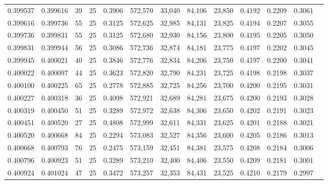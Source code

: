 \begin{tabular}{rrrrrrrrrrrrr}
0.399537 & 0.399616 &    39 &  25 &                                     0.3906 & 572,570 &  33,040 &  84,106 &  23,850 & 0.4192 & 0.2209 & 0.3061 \\
0.399616 & 0.399736 &    55 &  25 &                                     0.3125 & 572,625 &  32,985 &  84,131 &  23,825 & 0.4194 & 0.2207 & 0.3055 \\
0.399736 & 0.399831 &    55 &  25 &                                     0.3125 & 572,680 &  32,930 &  84,156 &  23,800 & 0.4195 & 0.2205 & 0.3050 \\
0.399831 & 0.399944 &    56 &  25 &                                     0.3086 & 572,736 &  32,874 &  84,181 &  23,775 & 0.4197 & 0.2202 & 0.3045 \\
0.399945 & 0.400021 &    40 &  25 &                                     0.3846 & 572,776 &  32,834 &  84,206 &  23,750 & 0.4197 & 0.2200 & 0.3041 \\
0.400022 & 0.400097 &    44 &  25 &                                     0.3623 & 572,820 &  32,790 &  84,231 &  23,725 & 0.4198 & 0.2198 & 0.3037 \\
0.400100 & 0.400225 &    65 &  25 &                                     0.2778 & 572,885 &  32,725 &  84,256 &  23,700 & 0.4200 & 0.2195 & 0.3031 \\
0.400227 & 0.400318 &    36 &  25 &                                     0.4098 & 572,921 &  32,689 &  84,281 &  23,675 & 0.4200 & 0.2193 & 0.3028 \\
0.400319 & 0.400450 &    51 &  25 &                                     0.3289 & 572,972 &  32,638 &  84,306 &  23,650 & 0.4202 & 0.2191 & 0.3023 \\
0.400451 & 0.400520 &    27 &  25 &                                     0.4808 & 572,999 &  32,611 &  84,331 &  23,625 & 0.4201 & 0.2188 & 0.3021 \\
0.400520 & 0.400668 &    84 &  25 &                                     0.2294 & 573,083 &  32,527 &  84,356 &  23,600 & 0.4205 & 0.2186 & 0.3013 \\
0.400668 & 0.400793 &    76 &  25 &                                     0.2475 & 573,159 &  32,451 &  84,381 &  23,575 & 0.4208 & 0.2184 & 0.3006 \\
0.400796 & 0.400923 &    51 &  25 &                                     0.3289 & 573,210 &  32,400 &  84,406 &  23,550 & 0.4209 & 0.2181 & 0.3001 \\
0.400924 & 0.401024 &    47 &  25 &                                     0.3472 & 573,257 &  32,353 &  84,431 &  23,525 & 0.4210 & 0.2179 & 0.2997 \\

\end{tabular}
